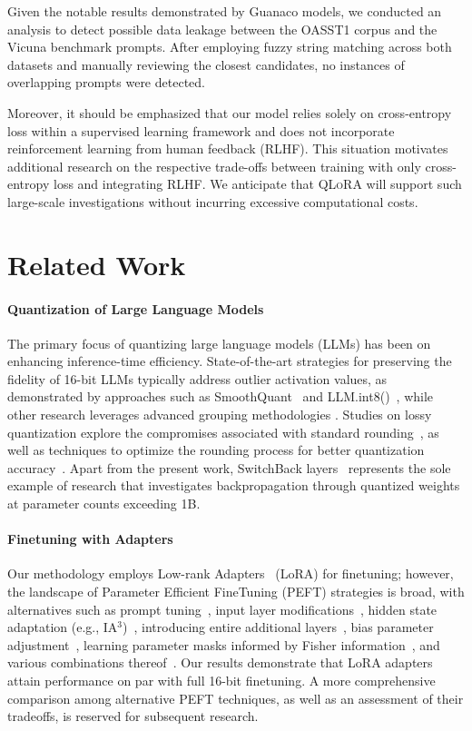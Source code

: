 Given the notable results demonstrated by {Guanaco} models, we conducted an analysis to detect possible data leakage between the OASST1 corpus and the Vicuna benchmark prompts. After employing fuzzy string matching across both datasets and manually reviewing the closest candidates, no instances of overlapping prompts were detected.

Moreover, it should be emphasized that our model relies solely on cross-entropy loss within a supervised learning framework and does not incorporate reinforcement learning from human feedback (RLHF). This situation motivates additional research on the respective trade-offs between training with only cross-entropy loss and integrating RLHF. We anticipate that \textsc{QLoRA} will support such large-scale investigations without incurring excessive computational costs.

\section{Related Work}

\paragraph{Quantization of Large Language Models} The primary focus of quantizing large language models (LLMs) has been on enhancing inference-time efficiency. State-of-the-art strategies for preserving the fidelity of 16-bit LLMs typically address outlier activation values, as demonstrated by approaches such as SmoothQuant~\citep{xiao2022smoothquant} and LLM.int8()~\citep{dettmers2022llm}, while other research leverages advanced grouping methodologies \citep{park2022nuqmm, yao2022zeroquant}. Studies on lossy quantization explore the compromises associated with standard rounding~\citep{dettmers2022case,zeng2022glm,pope2022efficiently}, as well as techniques to optimize the rounding process for better quantization accuracy~\citep{frantar2022gptq}. Apart from the present work, SwitchBack layers~\citep{wortsman2023stable} represents the sole example of research that investigates backpropagation through quantized weights at parameter counts exceeding 1B.

\paragraph{Finetuning with Adapters} Our methodology employs Low-rank Adapters~\citep{hu2021lora} (LoRA) for finetuning; however, the landscape of Parameter Efficient FineTuning (PEFT) strategies is broad, with alternatives such as prompt tuning~\citep{qin2021learning,lester2021power,li2021prefix}, input layer modifications~\citep{an2022input}, hidden state adaptation (e.g., IA$^3$)~\citep{liu2022few}, introducing entire additional layers~\citep{houlsby2019parameter}, bias parameter adjustment~\citep{zaken2021bitfit}, learning parameter masks informed by Fisher information~\citep{sung2021training}, and various combinations thereof~\citep{henderson2021compacter}. Our results demonstrate that LoRA adapters attain performance on par with full 16-bit finetuning. A more comprehensive comparison among alternative PEFT techniques, as well as an assessment of their tradeoffs, is reserved for subsequent research.


